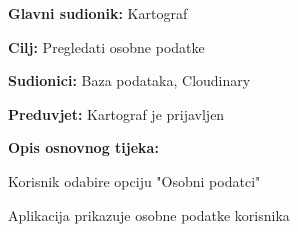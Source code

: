 \begin{packed_item}
\begin{packed_item}
					\end{packed_item}
					\end{packed_item}
				
					\noindent {}
					\begin{packed_item}
						
						\item \textbf{Glavni sudionik: }Kartograf
						\item  \textbf{Cilj:} Pregledati osobne podatke
						\item  \textbf{Sudionici:} Baza podataka, Cloudinary
						\item  \textbf{Preduvjet:} Kartograf je prijavljen
						\item  \textbf{Opis osnovnog tijeka:}
						
						\item[] \begin{packed_enum}
							
							\item Korisnik odabire opciju "Osobni podatci"
							\item Aplikacija prikazuje osobne podatke korisnika
						\end{packed_enum}
					\end{packed_item}
					

